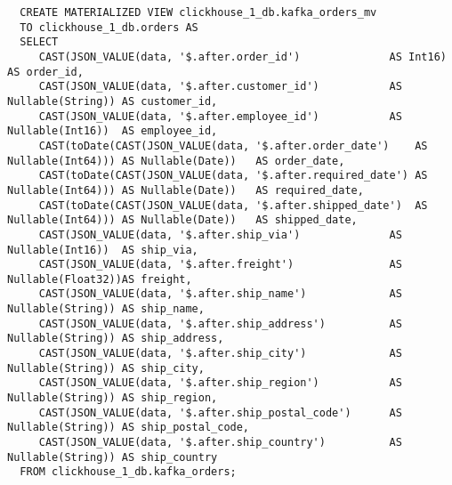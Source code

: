 \begin{lstlisting}
  CREATE MATERIALIZED VIEW clickhouse_1_db.kafka_orders_mv
  TO clickhouse_1_db.orders AS
  SELECT
	 CAST(JSON_VALUE(data, '$.after.order_id')              AS Int16)           AS order_id,
	 CAST(JSON_VALUE(data, '$.after.customer_id')           AS Nullable(String)) AS customer_id,
	 CAST(JSON_VALUE(data, '$.after.employee_id')           AS Nullable(Int16))  AS employee_id,
	 CAST(toDate(CAST(JSON_VALUE(data, '$.after.order_date')    AS Nullable(Int64))) AS Nullable(Date))   AS order_date,
	 CAST(toDate(CAST(JSON_VALUE(data, '$.after.required_date') AS Nullable(Int64))) AS Nullable(Date))   AS required_date,
	 CAST(toDate(CAST(JSON_VALUE(data, '$.after.shipped_date')  AS Nullable(Int64))) AS Nullable(Date))   AS shipped_date,
	 CAST(JSON_VALUE(data, '$.after.ship_via')              AS Nullable(Int16))  AS ship_via,
	 CAST(JSON_VALUE(data, '$.after.freight')               AS Nullable(Float32))AS freight,
	 CAST(JSON_VALUE(data, '$.after.ship_name')             AS Nullable(String)) AS ship_name,
	 CAST(JSON_VALUE(data, '$.after.ship_address')          AS Nullable(String)) AS ship_address,
	 CAST(JSON_VALUE(data, '$.after.ship_city')             AS Nullable(String)) AS ship_city,
	 CAST(JSON_VALUE(data, '$.after.ship_region')           AS Nullable(String)) AS ship_region,
	 CAST(JSON_VALUE(data, '$.after.ship_postal_code')      AS Nullable(String)) AS ship_postal_code,
	 CAST(JSON_VALUE(data, '$.after.ship_country')          AS Nullable(String)) AS ship_country
  FROM clickhouse_1_db.kafka_orders;
  \end{lstlisting}




